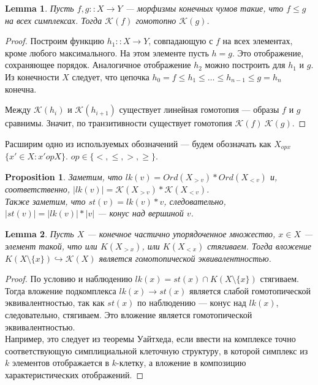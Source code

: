 \documentclass[a4paper, 12pt]{article}
\newtheorem{proposition}{Proposition}
\newtheorem{lemma}{Lemma}
\theoremstyle{definition}
\theoremstyle{remark}
\begin{document}
\begin{lemma}
  Пусть $f,g :: X \to Y$ --- морфизмы конечных чумов такие, что $f \leqslant g$ на всех симплексах. Тогда $\mathcal{K}(f)$ гомотопно $\mathcal{K}(g)$.
\end{lemma}
\begin{proof}
  Построим функцию $h_1 :: X \to Y$, совпадающую с $f$ на всех элементах, кроме любого максимального. На этом элементе пусть $h = g$. Это отображение, сохраняющее порядок. Аналогичное отображение $h_2$ можно построить для $h_1$ и $g$.
  Из конечности $X$ следует, что цепочка $h_0 = f \leqslant h_1 \leqslant \ldots \leqslant h_{n-1} \leqslant g = h_n$ конечна.

  Между $\mathcal{K}(h_i)$ и $\mathcal{K}(h_{i+1})$ существует линейная гомотопия --- образы $f$ и $g$ сравнимы. Значит, по транзитивности существует гомотопия $\mathcal{K}(f) ~ \mathcal{K}(g)$.
\end{proof}

Расширим одно из используемых обозначений ---  будем обозначать как $X_{op x}$ $\{x' \in X: x' op X\}$. $op \in \{<, \leqslant, >, \geqslant\}$.

\begin{proposition}
  Заметим, что $lk(v) = Ord(X_{>v}) * Ord(X_{<v})$ и, соответственно, $|lk(v)| = \mathcal{K}(X_{>v}) * \mathcal{K}(X_{<v})$.\\
  Также заметим, что $st(v) = lk(v) * v$, следовательно, $|st(v)| = |lk(v)| * |v|$ --- конус над вершиной $v$.
\end{proposition}

\begin{lemma}
  Пусть $X$ --- конечное частично упорядоченное множество, $x \in X$ --- элемент такой, что или $K(X_{>x})$, или $K(X_{<x})$ стягиваем. Тогда вложение $K(X\setminus\{x\}) \hookrightarrow \mathcal{K}(X)$ является гомотопической эквивалентностью.
\end{lemma}
\begin{proof}
  По условию и наблюдению $lk(x) = st(x) \cap K(X \setminus \{x\})$ стягиваем. Тогда вложение подкомплекса $lk(x) \to st(x)$ является слабой гомотопической эквивалентностью, так как $st(x)$ по наблюдению --- конус над $lk(x)$, следовательно, стягиваем. Это вложение является гомотопической эквивалентностью.\\
  Например, это следует из теоремы Уайтхеда, если ввести на комплексе точно соответствующую симплициальной клеточную структуру, в которой симплекс из $k$ элементов отображается в $k$-клетку, а вложение в композицию характеристических отображений.
\end{proof}
\end{document}
